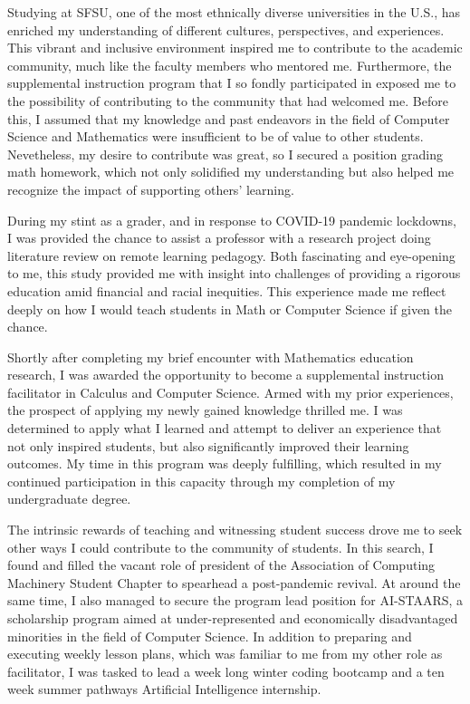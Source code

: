 \documentclass[12pt]{article}
\begin{document}
Studying at SFSU, one of the most ethnically diverse universities in the U.S., has enriched my understanding of different cultures,
perspectives, and experiences. This vibrant and inclusive environment inspired me to contribute to the academic community, much like the
faculty members who mentored me.  Furthermore, the supplemental instruction program that I so fondly participated in exposed me to the
possibility of contributing to the community that had welcomed me.  Before this, I assumed that my knowledge and past endeavors in the field
of Computer Science and Mathematics were insufficient to be of value to other students.  Nevetheless, my desire to contribute was great, so
I secured a position grading math homework, which not only solidified my understanding but also helped me recognize the impact of supporting
others' learning.

During my stint as a grader, and in response to COVID-19 pandemic lockdowns, I was provided the chance to assist a professor with a research
project doing literature review on remote learning pedagogy.  Both fascinating and eye-opening to me, this study provided me with insight
into challenges of providing a rigorous education amid financial and racial inequities.  This experience made me reflect deeply on how I
would teach students in Math or Computer Science if given the chance.

Shortly after completing my brief encounter with Mathematics education research, I was awarded the opportunity to become a supplemental
instruction facilitator in Calculus and Computer Science.  Armed with my prior experiences, the prospect of applying my newly gained
knowledge thrilled me.  I was determined to apply what I learned and attempt to deliver an experience that not only inspired students, but
also significantly improved their learning outcomes.  My time in this program was deeply fulfilling, which resulted in my continued
participation in this capacity through my completion of my undergraduate degree.

The intrinsic rewards of teaching and witnessing student success drove me to seek other ways I could contribute to the community of
students.  In this search, I found and filled the vacant role of president of the Association of Computing Machinery Student Chapter to
spearhead a post-pandemic revival.  At around the same time, I also managed to secure the program lead position for AI-STAARS, a scholarship
program aimed at under-represented and economically disadvantaged minorities in the field of Computer Science.  In addition to preparing and
executing weekly lesson plans, which was familiar to me from my other role as facilitator, I was tasked to lead a week long winter coding
bootcamp and a ten week summer pathways Artificial Intelligence internship.
\end{document}

